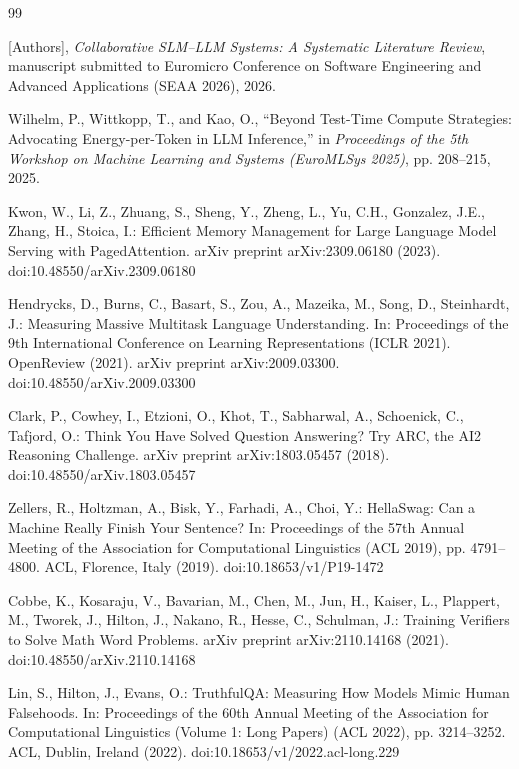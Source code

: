 \begin{thebibliography}{99}

[Authors], \textit{Collaborative SLM--LLM Systems: A Systematic Literature Review}, manuscript submitted to Euromicro Conference on Software Engineering and Advanced Applications (SEAA 2026), 2026.

Wilhelm, P., Wittkopp, T., and Kao, O., ``Beyond Test-Time Compute Strategies: Advocating Energy-per-Token in LLM Inference,'' in \textit{Proceedings of the 5th Workshop on Machine Learning and Systems (EuroMLSys 2025)}, pp. 208--215, 2025.

Kwon, W., Li, Z., Zhuang, S., Sheng, Y., Zheng, L., Yu, C.H., Gonzalez, J.E., Zhang, H., Stoica, I.: Efficient Memory Management for Large Language Model Serving with PagedAttention. arXiv preprint arXiv:2309.06180 (2023). doi:10.48550/arXiv.2309.06180

Hendrycks, D., Burns, C., Basart, S., Zou, A., Mazeika, M., Song, D., Steinhardt, J.: Measuring Massive Multitask Language Understanding. In: Proceedings of the 9th International Conference on Learning Representations (ICLR 2021). OpenReview (2021). arXiv preprint arXiv:2009.03300. doi:10.48550/arXiv.2009.03300

Clark, P., Cowhey, I., Etzioni, O., Khot, T., Sabharwal, A., Schoenick, C., Tafjord, O.: Think You Have Solved Question Answering? Try ARC, the AI2 Reasoning Challenge. arXiv preprint arXiv:1803.05457 (2018). doi:10.48550/arXiv.1803.05457

Zellers, R., Holtzman, A., Bisk, Y., Farhadi, A., Choi, Y.: HellaSwag: Can a Machine Really Finish Your Sentence? In: Proceedings of the 57th Annual Meeting of the Association for Computational Linguistics (ACL 2019), pp. 4791--4800. ACL, Florence, Italy (2019). doi:10.18653/v1/P19-1472

Cobbe, K., Kosaraju, V., Bavarian, M., Chen, M., Jun, H., Kaiser, L., Plappert, M., Tworek, J., Hilton, J., Nakano, R., Hesse, C., Schulman, J.: Training Verifiers to Solve Math Word Problems. arXiv preprint arXiv:2110.14168 (2021). doi:10.48550/arXiv.2110.14168

Lin, S., Hilton, J., Evans, O.: TruthfulQA: Measuring How Models Mimic Human Falsehoods. In: Proceedings of the 60th Annual Meeting of the Association for Computational Linguistics (Volume 1: Long Papers) (ACL 2022), pp. 3214--3252. ACL, Dublin, Ireland (2022). doi:10.18653/v1/2022.acl-long.229


\end{thebibliography}
